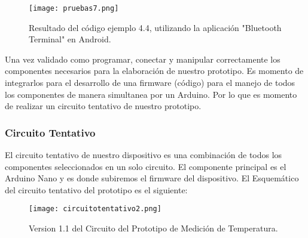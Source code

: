 \begin{figure}[H]
	\centering
	\texttt{[image: pruebas7.png]}
	\caption{Resultado del código ejemplo 4.4, utilizando la aplicación "Bluetooth Terminal" en Android.}
\end{figure}

\par \noindent
Una vez validado como programar, conectar y manipular correctamente los componentes necesarios para la elaboración de nuestro prototipo. Es momento de integrarlos para el desarrollo de una firmware (código) para el manejo de todos los componentes de manera simultanea por un Arduino. Por lo que es momento de realizar un circuito tentativo de nuestro prototipo.

\subsubsection{Circuito Tentativo}
\par 
El circuito tentativo de nuestro dispositivo es una combinación de todos los componentes seleccionados en un solo circuito. El componente principal es el Arduino Nano y es donde subiremos el firmware del dispositivo. El Esquemático del circuito tentativo del prototipo es el siguiente:

\begin{figure}[H]
	\texttt{[image: circuitotentativo2.png]}
	\caption{Version 1.1 del Circuito del Prototipo de Medición de Temperatura.}
\end{figure}